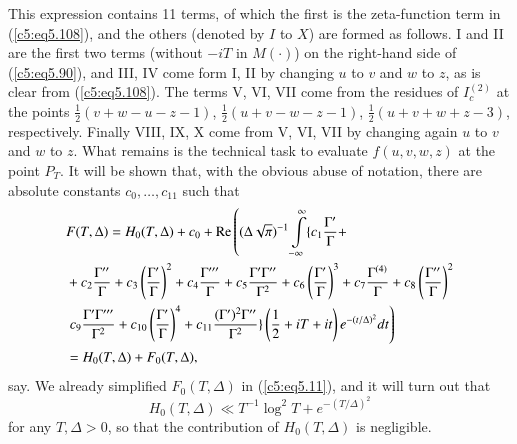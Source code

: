This expression contains 11 terms, of which the first is the
zeta-function term in (\ref{c5:eq5.108}), and the others (denoted by
$I$ to $X$) are formed as follows. I and II are the first two terms
(without $-iT$ in $M(\cdot)$) on the right-hand side of
(\ref{c5:eq5.90}), and III, IV come form I, II by changing $u$ to $v$
and $w$ to $z$, as is clear from (\ref{c5:eq5.108}). The terms V, VI,
VII come from the residues of $I^{(2)}_c$ at the points $\frac{1}{2}
(v+w-u-z-1)$, $\frac{1}{2}(u+v-w-z-1)$, $\frac{1}{2} (u+v+w+z-3)$,
respectively. Finally VIII, IX, X come from V, VI, VII by changing
again $u$ to $v$ and $w$ to $z$. What remains is the technical task to
evaluate $f(u,v,w,z)$ at the point $P_T$. It will be shown that, with
the obvious abuse of notation, there are absolute constants $c_0,
\ldots, c_{11}$ such that  
\begin{align}
& F(T,\Delta) = H_0 (T,\Delta) + c_0 + \operatorname{Re} \left( (\Delta
\sqrt{\pi})^{-1}  \int\limits^{\infty}_{-\infty} \{ c_1
\frac{\Gamma'}{\Gamma} + \right.\label{c5:eq5.112}\\ 
&+ c_2 \frac{\Gamma''}{\Gamma} + c_3 \left(\frac{\Gamma'}{\Gamma}
\right)^2 + c_4 \frac{\Gamma'''}{\Gamma} + c_5
\frac{\Gamma'\Gamma''}{\Gamma^2} + c_6 \left(\frac{\Gamma'}{\Gamma}
\right)^3 + c_7 \frac{\Gamma^{(4)}}{\Gamma} + c_8
\left(\frac{\Gamma''}{\Gamma} \right)^2\notag\\ 
&\left.  c_9 \frac{\Gamma'\Gamma'''}{\Gamma^2} + c_{10}
\left(\frac{\Gamma'}{\Gamma} \right)^4 + c_{11} \frac{(\Gamma')^2
  \Gamma''}{\Gamma^2} \} \left(\frac{1}{2} + iT + it \right)
e^{-(t/\Delta)^2} dt \right)\notag\\ 
& = H_0(T, \Delta) + F_0 (T,\Delta), \notag
\end{align}
say. We already simplified $F_0 (T,\Delta)$ in (\ref{c5:eq5.11}), and it will turn out that 
\begin{equation}
H_0 (T,\Delta) \ll T^{-1} \log^2 T +
e^{-(T/\Delta)^2}\label{c5:eq5.113} 
\end{equation}\pageoriginale
for any $T,\Delta >0$, so that the contribution of $H_0 (T,\Delta)$ is
negligible. 

